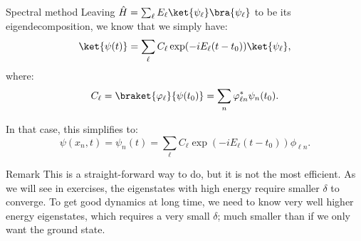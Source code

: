 \documentclass[a4paper]{article}
\begin{document}
\begin{parag}{Spectral method}
    Leaving $\hat{H} = \sum_{\ell} E_{\ell} \ket{\psi_{\ell}} \bra{\psi_{\ell}}$ to be its eigendecomposition, we know that we simply have:
    \[\ket{\psi\left(t\right)} = \sum_{\ell} C_{\ell} \exp\left(-i E_{\ell}\left(t-  t_0\right)\right) \ket{\psi_{\ell}},\]
    where: 
    \[C_{\ell} = \braket{\phi_{\ell}}{\psi\left(t_0\right)} = \sum_{n} \phi_{\ell n}^* \psi_n\left(t_0\right).\]
    
    In that case, this simplifies to:
    \[\psi\left(x_n, t\right) = \psi_n\left(t\right) = \sum_{\ell} C_{\ell} \exp\left(-i E_{\ell}\left(t- t_0\right)\right) \phi_{\ell n}.\]

    \begin{subparag}{Remark}
        This is a straight-forward way to do, but it is not the most efficient. As we will see in exercises, the eigenstates with high energy require smaller $\delta$ to converge. To get good dynamics at long time, we need to know very well higher energy eigenstates, which requires a very small $\delta$; much smaller than if we only want the ground state.
    \end{subparag}
\end{parag}
\end{document}
